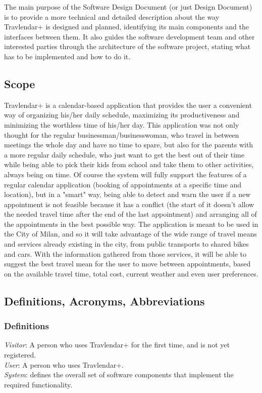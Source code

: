 \documentclass[12pt]{article}
\begin{document}
The main purpose of the Software Design Document (or just Design Document) is to provide a more technical and detailed description about the way Travlendar+ is designed and planned, identifying its main components and the interfaces between them. It also guides the software development team and other interested parties through the architecture of the software project, stating what has to be implemented and how to do it.

\subsection{Scope}
Travlendar+ is a calendar-based application that provides the user a convenient way of organizing his/her daily schedule, maximizing its productiveness and minimizing the worthless time of his/her day. This application was not only thought for the regular businessman/businesswoman, who travel in between meetings the whole day and have no time to spare, but also for the parents with a more regular daily schedule, who just want to get the best out of their time while being able to pick their kids from school and take them to other activities, always being on time.
Of course the system will fully support the features of a regular calendar application (booking of appointments at a specific time and location), but in a "smart" way, being able to detect and warn the user if a new appointment is not feasible because it has a conflict (the start of it doesn't allow the needed travel time after the end of the last appointment) and arranging all of the appointments in the best possible way. The application is meant to be used in the City of Milan, and so it will take advantage of the wide range of travel means and services already existing in the city, from public transports to shared bikes and cars. With the information gathered from those services, it will be able to suggest the best travel mean for the user to move between appointments, based on the available travel time, total cost, current weather and even user preferences.


\subsection{Definitions, Acronyms, Abbreviations}
\subsubsection{Definitions}
\textit{Visitor}: A person who uses Travlendar+ for the first time, and is not yet registered.\\
\textit{User}: A person who uses Travlendar+.\\
\textit{System}: defines the overall set of software components that implement the required functionality.\\
\end{document}
